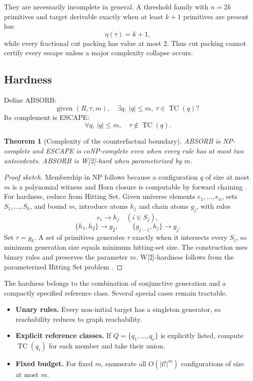 \documentclass[11pt]{article}
\newtheorem{theorem}{Theorem}[section]
\newcommand{\TC}{\operatorname{TC}}
\newcommand{\etaMin}{\eta}
\newcommand{\Cset}{\mathcal C}
\begin{document}
They are necessarily incomplete in general. A threshold family with $n=2k$ primitives and target derivable exactly when at least $k+1$ primitives are present has
\[
\etaMin(\tau)=k+1,
\]
while every fractional cut packing has value at most $2$. Thus cut packing cannot certify every escape unless a major complexity collapse occurs.

\subsection{Hardness}

Define ABSORB:
\[
\text{given }(R,\tau,m),\quad
\exists q,\ |q|\le m,\ \tau\in\TC(q)?
\]
Its complement is ESCAPE:
\[
\forall q,\ |q|\le m,\quad\tau\notin\TC(q).
\]

\begin{theorem}[Complexity of the counterfactual boundary]
ABSORB is NP-complete and ESCAPE is coNP-complete even when every rule has at most two antecedents. ABSORB is W[2]-hard when parameterized by $m$.
\end{theorem}

\begin{proof}[Proof sketch]
Membership in NP follows because a configuration $q$ of size at most $m$ is a polynomial witness and Horn closure is computable by forward chaining \cite{dowling1984}. For hardness, reduce from Hitting Set. Given universe elements $e_1,\ldots,e_n$, sets $S_1,\ldots,S_k$, and bound $m$, introduce atoms $h_j$ and chain atoms $g_j$, with rules
\[
e_i\to h_j\quad(i\in S_j),
\]
\[
\{h_1,h_2\}\to g_2,\qquad
\{g_{j-1},h_j\}\to g_j.
\]
Set $\tau=g_k$. A set of primitives generates $\tau$ exactly when it intersects every $S_j$, so minimum generation size equals minimum hitting-set size. The construction uses binary rules and preserves the parameter $m$. W[2]-hardness follows from the parameterized Hitting Set problem \cite{garey1979,downey1999}.
\end{proof}

The hardness belongs to the combination of conjunctive generation and a compactly specified reference class. Several special cases remain tractable.

\begin{itemize}[leftmargin=*]
\item \textbf{Unary rules.} Every non-initial target has a singleton generator, so reachability reduces to graph reachability.
\item \textbf{Explicit reference classes.} If $Q=\{q_1,\ldots,q_r\}$ is explicitly listed, compute $\TC(q_i)$ for each member and take their union.
\item \textbf{Fixed budget.} For fixed $m$, enumerate all $O(|\Cset|^m)$ configurations of size at most $m$.
\end{itemize}
\end{document}
